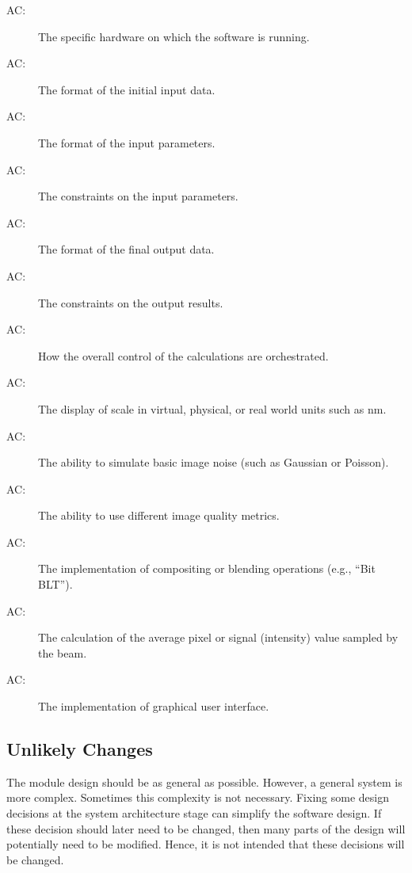 \documentclass[12pt, titlepage]{article}
\newcounter{acnum}
\newcommand{\actheacnum}{AC\theacnum}
\begin{document}
\begin{description}
  \item[ \actheacnum \label{AC_hardware}:] The specific
    hardware on which the software is running.
  \item[ \actheacnum \label{AC_input}:] The format of the
    initial input data.
  \item[ \actheacnum \label{AC_inFormat}:] The format of the input parameters.
  \item[ \actheacnum \label{AC_inVerif}:] The constraints on the input parameters.
  \item[ \actheacnum \label{AC_outFormat}:] The format of the final output data.
  \item[ \actheacnum \label{AC_outVerif}:] The constraints on the output results.
  \item[ \actheacnum \label{AC_calc}:] How the overall control of the
    calculations are orchestrated.
  \item[ \actheacnum \label{AC_displayUnits}:] The display of scale in
    virtual, physical, or real world units such as \si{nm}.
  \item[ \actheacnum \label{AC_simNoise}:] The ability to simulate basic
    image noise (such as Gaussian or Poisson).
  \item[ \actheacnum \label{AC_imgMetricAlgos}:] The ability
    to use different image quality metrics.
  \item[ \actheacnum \label{AC_maskOpts}:] The implementation of compositing
    or blending operations (e.g., ``Bit BLT'').
  \item[ \actheacnum \label{AC_calcSignal}:] The calculation of the
    average pixel or signal (intensity) value sampled by the beam.
  \item[ \actheacnum \label{AC_GUI}:] The implementation of graphical user
    interface.
\end{description}

\subsection{Unlikely Changes} \label{SecUchange}

The module design should be as general as possible. However, a general system is
more complex. Sometimes this complexity is not necessary. Fixing some design
decisions at the system architecture stage can simplify the software design. If
these decision should later need to be changed, then many parts of the design
will potentially need to be modified. Hence, it is not intended that these
decisions will be changed.
\end{document}
